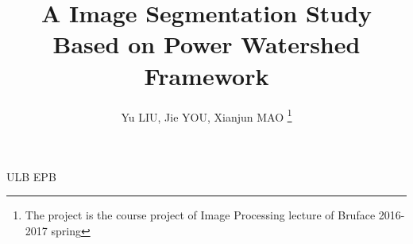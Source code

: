 \documentclass[journal]{IEEEtran}
\begin{document}
%
\title{A Image Segmentation Study Based on Power Watershed Framework}
%
%
%

\author{Yu LIU,
        Jie YOU, Xianjun MAO
\thanks{The project is the course project of Image Processing lecture of Bruface 2016-2017 spring}}

% 
%



%
{ULB EPB}

\maketitle
\end{document}

